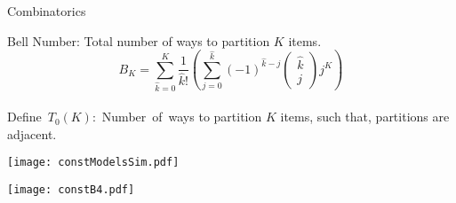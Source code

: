 \documentclass[ xcolor = pdftex, dvipsnames, table ]{beamer}
\begin{document}
%
%

%
\section{}
\begin{frame}{Combinatorics}
%
\vspace{-0.5cm}
\hspace{-0.5cm}
\begin{minipage}[h!]{0.49\textwidth}
Bell Number: Total number of ways to partition $K$ items.
\\
\begin{equation*}
B_K=\sum_{\hat k=0}^{K} \frac{1}{\hat k!} \left( \sum_{j=0}^{\hat k} (-1)^{\hat k -j} \left(\substack{\hat k \\ j}\right) j^K \right)
\end{equation*}
\\
\mbox{Define $T_0(K)$: Number of ways} to partition $K$ items, such that, partitions are adjacent. %
\end{minipage}
\begin{minipage}[h!]{0.49\textwidth}
        \hspace{0.7cm}
        \texttt{[image: constModelsSim.pdf]}
\end{minipage}
\texttt{[image: constB4.pdf]}
%
\end{frame}

%
%

%
\end{document}
